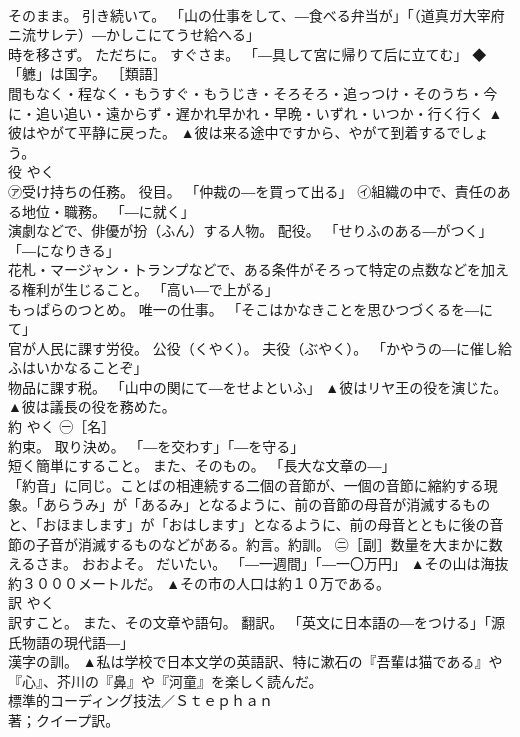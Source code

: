 \documentclass[8pt]{extreport}
\begin{document}
\begin{CJK}{UTF8}{min}
\\	そのまま。 引き続いて。 「山の仕事をして、―食べる弁当が」「（道真ガ大宰府ニ流サレテ）―かしこにてうせ給へる」 
\\	時を移さず。 ただちに。 すぐさま。 「―具して宮に帰りて后に立てむ」 ◆「軈」は国字。 ［類語］
\\	間もなく・程なく・もうすぐ・もうじき・そろそろ・追っつけ・そのうち・今に・追い追い・遠からず・遅かれ早かれ・早晩・いずれ・いつか・行く行く	▲彼はやがて平静に戻った。 ▲彼は来る途中ですから、やがて到着するでしょう。
\\	役	やく	
\\	㋐受け持ちの任務。 役目。 「仲裁の―を買って出る」 ㋑組織の中で、責任のある地位・職務。 「―に就く」 
\\	演劇などで、俳優が扮（ふん）する人物。 配役。 「せりふのある―がつく」「―になりきる」 
\\	花札・マージャン・トランプなどで、ある条件がそろって特定の点数などを加える権利が生じること。 「高い―で上がる」 
\\	もっぱらのつとめ。 唯一の仕事。 「そこはかなきことを思ひつづくるを―にて」 
\\	官が人民に課す労役。 公役（くやく）。 夫役（ぶやく）。 「かやうの―に催し給ふはいかなることぞ」 
\\	物品に課す税。 「山中の関にて―をせよといふ」	▲彼はリヤ王の役を演じた。 ▲彼は議長の役を務めた。
\\	約	やく	㊀［名］ 
\\	約束。 取り決め。 「―を交わす」「―を守る」 
\\	短く簡単にすること。 また、そのもの。 「長大な文章の―」 
\\	「約音」に同じ。ことばの相連続する二個の音節が、一個の音節に縮約する現象。「あらうみ」が「あるみ」となるように、前の音節の母音が消滅するものと、「おほまします」が「おはします」となるように、前の母音とともに後の音節の子音が消滅するものなどがある。約言。約訓。 ㊁［副］数量を大まかに数えるさま。 おおよそ。 だいたい。 「―一週間」「―一〇万円」	▲その山は海抜約３０００メートルだ。 ▲その市の人口は約１０万である。
\\	訳	やく	
\\	訳すこと。 また、その文章や語句。 翻訳。 「英文に日本語の―をつける」「源氏物語の現代語―」 
\\	漢字の訓。	▲私は学校で日本文学の英語訳、特に漱石の『吾輩は猫である』や『心』、芥川の『鼻』や『河童』を楽しく読んだ。 
\\	標準的コーディング技法／Ｓｔｅｐｈａｎ 
\\	著；クイープ訳。

\end{CJK}
\end{document}
